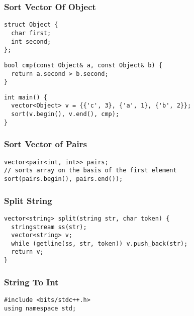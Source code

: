 \documentclass[twoside]{article}
\begin{document}
\begin{multicols*}{2}
\subsubsectionfont{\large\bfseries\sffamily\underline}
\subsubsection*{Sort Vector Of Object}
\begin{verbatim}
struct Object {
  char first;
  int second;
};
\end{verbatim}
\vspace{-12pt}
\begin{verbatim}
bool cmp(const Object& a, const Object& b) {
  return a.second > b.second;
}
\end{verbatim}
\vspace{-12pt}
\begin{verbatim}
int main() {
  vector<Object> v = {{'c', 3}, {'a', 1}, {'b', 2}};
  sort(v.begin(), v.end(), cmp);
}
\end{verbatim}

\subsubsectionfont{\large\bfseries\sffamily\underline}
\subsubsection*{Sort Vector of Pairs}
\begin{verbatim}
vector<pair<int, int>> pairs;
// sorts array on the basis of the first element
sort(pairs.begin(), pairs.end());

\end{verbatim}

\subsubsectionfont{\large\bfseries\sffamily\underline}
\subsubsection*{Split String}
\begin{verbatim}
vector<string> split(string str, char token) {
  stringstream ss(str);
  vector<string> v;
  while (getline(ss, str, token)) v.push_back(str);
  return v;
}
\end{verbatim}

\subsubsectionfont{\large\bfseries\sffamily\underline}
\subsubsection*{String To Int}
\begin{verbatim}
#include <bits/stdc++.h>
using namespace std;


\end{verbatim}
\end{multicols*}
\end{document}
